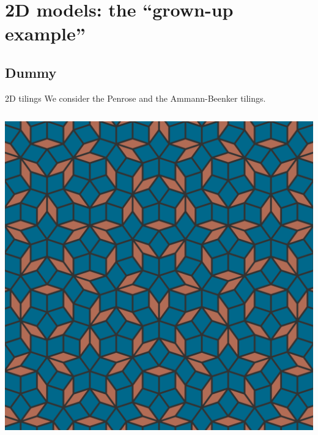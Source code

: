 \documentclass[xcolor=x11names,compress,professionalfonts, aspectratio=169]{beamer}
\author{Nicolas Macé}
\renewcommand{\(}{\begin{columns}}
\renewcommand{\)}{\end{columns}}
\newcommand{\<}[1]{\begin{column}{#1}}
\renewcommand{\>}{\end{column}}
\begin{document}
\section{2D models: the ``grown-up example''}
\subsection{Dummy}

\begin{frame}{2D tilings}
We consider the Penrose and the Ammann-Beenker tilings.
\begin{columns}
\begin{column}{5cm}
{\centering
\includegraphics[scale=.09]{img/penrose.png}

}
\end{column}
\end{columns}
\end{frame}
\end{document}
